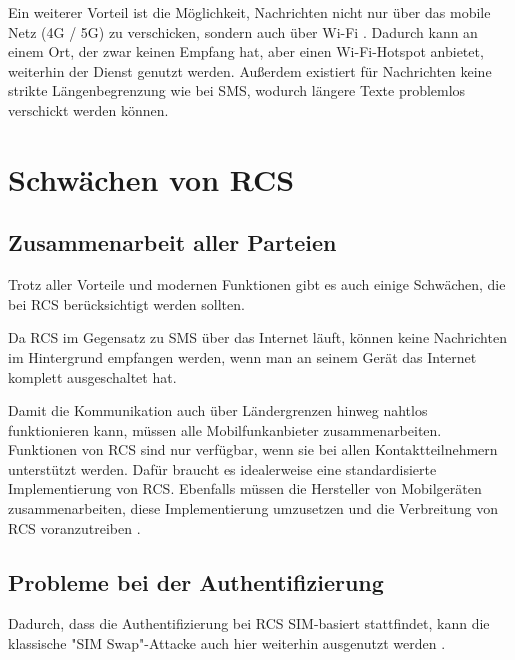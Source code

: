 \documentclass[conference]{IEEEtran}
\begin{document}
Ein weiterer Vorteil ist die Möglichkeit, Nachrichten nicht nur über das mobile Netz (4G / 5G) zu verschicken, sondern auch über Wi-Fi \cite{5gmsg}.
Dadurch kann an einem Ort, der zwar keinen Empfang hat, aber einen Wi-Fi-Hotspot anbietet, weiterhin der Dienst genutzt werden.
Außerdem existiert für Nachrichten keine strikte Längenbegrenzung wie bei SMS, wodurch längere Texte problemlos verschickt werden können.


\section{Schwächen von RCS}

\subsection{Zusammenarbeit aller Parteien}

Trotz aller Vorteile und modernen Funktionen gibt es auch einige Schwächen, die bei RCS berücksichtigt werden sollten.

Da RCS im Gegensatz zu SMS über das Internet läuft, können keine Nachrichten im Hintergrund empfangen werden, wenn man an seinem Gerät das Internet komplett ausgeschaltet hat.

Damit die Kommunikation auch über Ländergrenzen hinweg nahtlos funktionieren kann, müssen alle Mobilfunkanbieter zusammenarbeiten.
Funktionen von RCS sind nur verfügbar, wenn sie bei allen Kontaktteilnehmern unterstützt werden.
Dafür braucht es idealerweise eine standardisierte Implementierung von RCS.
Ebenfalls müssen die Hersteller von Mobilgeräten zusammenarbeiten, diese Implementierung umzusetzen und die Verbreitung von RCS voranzutreiben \cite{rcsmno}.

\subsection{Probleme bei der Authentifizierung}

Dadurch, dass die Authentifizierung bei RCS SIM-basiert stattfindet, kann die klassische "SIM Swap"-Attacke auch hier weiterhin ausgenutzt werden \cite{sendoutsms}.
\end{document}
